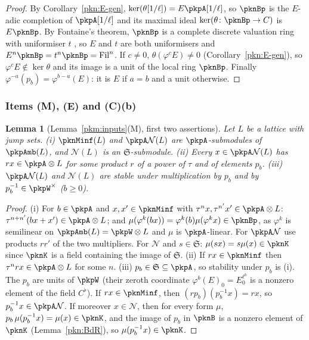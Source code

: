 \documentclass[10pt]{amsart}
\newtheorem{lemma}[theorem]{Lemma}
\theoremstyle{definition}
\theoremstyle{remark}
\begin{document}
\begin{proof}
By Corollary~\ref{pkn:E-gen}, $\ker(\theta[1/\ell])=E\pkpA[1/\ell]$, so $\pknBp$ is the $E$-adic
completion of $\pkpA[1/\ell]$ and its maximal ideal $\ker(\theta\colon\pknBp\to C)$ is $E\pknBp$. By
Fontaine's theorem, $\pknBp$ is a complete discrete valuation ring with uniformiser $t$ \cite[1.5.2, 1.5.4]{pkfFontaineII}, so $E$ and
$t$ are both uniformisers and $E^n\pknBp=t^n\pknBp=\mathrm{Fil}^n$. If $c\ne0$, $\theta(\varphi^cE)\ne0$
(Corollary~\ref{pkn:E-gen}), so $\varphi^cE\notin\ker\theta$ and its image is a unit of the local ring
$\pknBp$. Finally $\varphi^{-a}(p_b)=\varphi^{b-a}(E)$: it is $E$ if $a=b$ and a unit otherwise.
\end{proof}

\subsubsection{Items (M), (E) and (C)(b)}\label{pkn:ss-ME}

\begin{lemma}[Lemma~\ref{pkm:inputs}(M), first two assertions]\label{pkn:M}
Let $L$ be a lattice with jump sets. (i) $\pknMinf(L)$ and $\pkpA\mathcal N(L)$ are $\pkpA$-submodules of
$\pkpAmb(L)$, and $\mathcal N(L)$ is an $\mathfrak S$-submodule. (ii) Every $x\in\pkpA\mathcal N(L)$ has
$rx\in\pkpA\otimes L$ for some product $r$ of a power of $\tau$ and of elements $p_b$. (iii)
$\pkpA\mathcal N(L)$ and $\mathcal N(L)$ are stable under multiplication by $p_b$ and by $p_b^{-1}\in
\pkpW^\times$ ($b\ge0$).
\end{lemma}

\begin{proof}
(i) For $b\in\pkpA$ and $x,x'\in\pknMinf$ with $\tau^nx,\tau^{n'}x'\in\pkpA\otimes L$:
$\tau^{n+n'}(bx+x')\in\pkpA\otimes L$; and $\mu(\varphi^k(bx))=\varphi^k(b)\mu(\varphi^kx)\in\pknBp$, as
$\varphi^k$ is semilinear on $\pkpAmb(L)=\pkpW\otimes L$ and $\mu$ is $\pkpA$-linear. For
$\pkpA\mathcal N$ use products $rr'$ of the two multipliers. For $\mathcal N$ and $s\in\mathfrak S$:
$\mu(sx)=s\mu(x)\in\pknK$ since $\pknK$ is a field containing the image of $\mathfrak S$.
(ii) If $rx\in\pknMinf$ then $\tau^nrx\in\pkpA\otimes L$ for some $n$. (iii) $p_b\in\mathfrak
S\subseteq\pkpA$, so stability under $p_b$ is (i). The $p_b$ are units of $\pkpW$ (their zeroth
coordinate $\varphi^b(E)_0=E_0^{\ell^b}$ is a nonzero element of the field $C^\flat$). If $rx\in\pknMinf$,
then $(rp_b)(p_b^{-1}x)=rx$, so $p_b^{-1}x\in\pkpA\mathcal N$. If moreover $x\in\mathcal N$, then for every
form $\mu$, $p_b\,\mu(p_b^{-1}x)=\mu(x)\in\pknK$, and the image of $p_b$ in $\pknB$ is a nonzero element
of $\pknK$ (Lemma~\ref{pkn:BdR}), so $\mu(p_b^{-1}x)\in\pknK$.
\end{proof}
\end{document}

